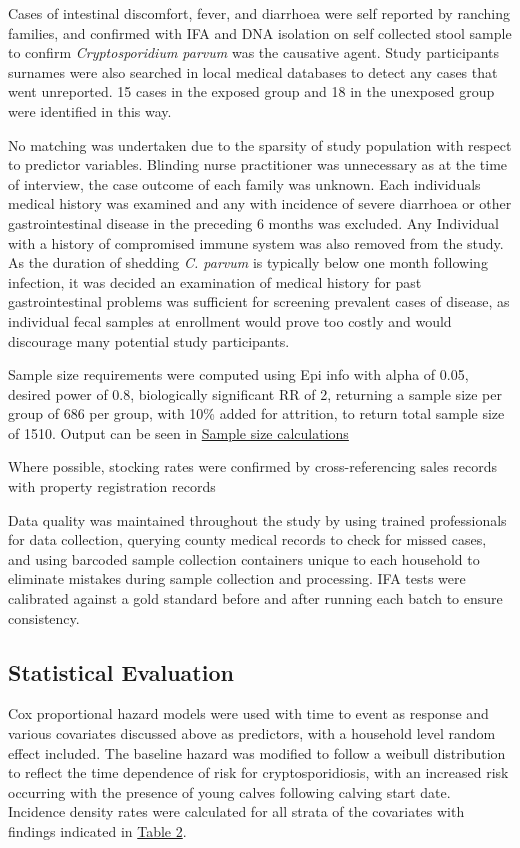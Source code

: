 \documentclass[12pt]{article}
\begin{document}
		Cases of intestinal discomfort, fever, and diarrhoea were self reported by ranching families, and confirmed with IFA and DNA isolation on self collected stool sample to confirm \emph{Cryptosporidium parvum} was the causative agent.
		Study participants surnames were also searched in local medical databases to detect any cases that went unreported. 15 cases in the exposed group and 18 in the unexposed group were identified in this way. 
		
		No matching was undertaken due to the sparsity of study population with respect to predictor variables. Blinding nurse practitioner was unnecessary as at the time of interview, the case outcome of each family was unknown.
		Each individuals medical history was examined and any with incidence of severe diarrhoea or other gastrointestinal disease in the preceding 6 months was excluded. Any Individual with a history of compromised immune system was also removed from the study.
		As the duration of shedding \emph{C. parvum} is typically below one month following infection, it was decided an examination of medical history for past gastrointestinal problems was sufficient for screening prevalent cases of disease, as individual fecal samples at enrollment would prove too costly and would discourage many potential study participants.
		


		Sample size requirements were computed using Epi info with alpha of 0.05, desired power of 0.8, biologically significant RR of 2, returning a sample size per group of 686 per group, with 10\% added for attrition, to return total sample size of 1510.
		Output can be seen in \hyperref[sample]{Sample size calculations}

		Where possible, stocking rates were confirmed by cross-referencing sales records with property registration records
		

		Data quality was maintained throughout the study by using trained professionals for data collection, querying county medical records to check for missed cases, and using barcoded sample collection containers unique to each household to eliminate mistakes during sample collection and processing.
		IFA tests were calibrated against a gold standard before and after running each batch to ensure consistency.

	\subsection{Statistical Evaluation}
		Cox proportional hazard models were used with time to event as response and various covariates discussed above as predictors, with a household level random effect included.
		The baseline hazard was modified to follow a weibull distribution to reflect the time dependence of risk for cryptosporidiosis, with an increased risk occurring with the presence of young calves following calving start date. 
		Incidence density rates were calculated for all strata of the covariates with findings indicated in \hyperref[table2]{Table 2}.
\end{document}
